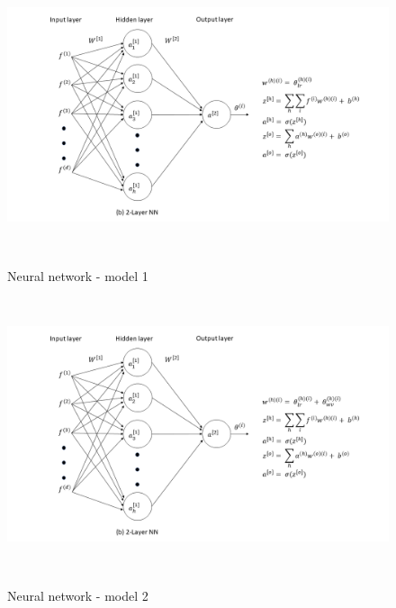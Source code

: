 \begin{figure}[htbp]
\centering
\includegraphics[width=16cm, height=8cm]{images/nn1.png}\\
\centering
\caption{Neural network - model 1}
\label{fig:foo}
\end{figure}

\begin{figure}[htbp]
\centering
\includegraphics[width=16cm, height=8cm]{images/nn2.png}\\
\centering
\caption{Neural network - model 2}
\label{fig:foo}
\end{figure}